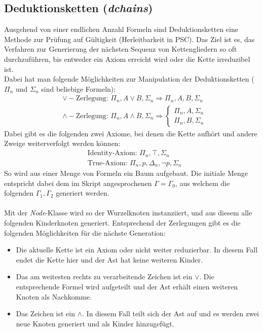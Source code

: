 \documentclass[11pt,a4paper,ngerman]{scrreprt}
\begin{document}
\subsection{Deduktionsketten (\textit{dchains})}
Ausgehend von einer endlichen Anzahl Formeln sind Deduktionsketten eine Methode zur Prüfung auf Gültigkeit (Herleitbarkeit in PSC). Das Ziel ist es, das Verfahren zur Generierung der nächsten Sequenz von Kettengliedern so oft durchzuführen, bis entweder ein Axiom erreicht wird oder die Kette irreduzibel ist.\\
Dabei hat man folgende Möglichkeiten zur Manipulation der Deduktionsketten ($\Pi_n$ und $\Sigma_n$ sind beliebige Formeln):
\begin{align}
&\vee-\text{Zerlegung: } \Pi_n, A \vee B, \Sigma_n \Rightarrow \Pi_n, A, B, \Sigma_n \\
&\wedge-\text{Zerlegung: } \Pi_n, A \wedge B, \Sigma_n \Rightarrow \left\{ 
\begin{matrix} \Pi_n, A, \Sigma_n \\
\Pi_n, B, \Sigma_n
\end{matrix}
\right.
\end{align}
Dabei gibt es die folgenden zwei Axiome, bei denen die Kette aufhört und andere Zweige weiterverfolgt werden können:
\begin{align}
&\text{Identity-Axiom: } \Pi_n, \top, \Sigma_n \\
&\text{True-Axiom: } \Pi_n, p, \Delta_n, \neg p, \Sigma_n 
\end{align}
So wird aus einer Menge von Formeln ein Baum aufgebaut. Die initiale Menge entspricht dabei dem im Skript angesprochenen $\Gamma = \Gamma_0$, aus welchem die folgenden $\Gamma_1, \Gamma_2$ generiert werden.\\\\
Mit der \textit{Node}-Klasse wird so der Wurzelknoten instanziiert, und aus diesem alle folgenden Kinderknoten generiert. Entsprechend der Zerlegungen gibt es die folgenden Möglichkeiten für die nächste Generation:
\begin{itemize}
\item Die aktuelle Kette ist ein Axiom oder nicht weiter reduzierbar. In diesem Fall endet die Kette hier und der Ast hat keine weiteren Kinder.
\item Das am weitesten rechts zu verarbeitende Zeichen ist ein $\vee$. Die entsprechende Formel wird aufgeteilt und der Ast erhält einen weiteren Knoten als Nachkomme.
\item Das Zeichen ist ein $\wedge$. In diesem Fall teilt sich der Ast auf und es werden zwei neue Knoten generiert und als Kinder hinzugefügt.
\end{itemize}
\end{document}
